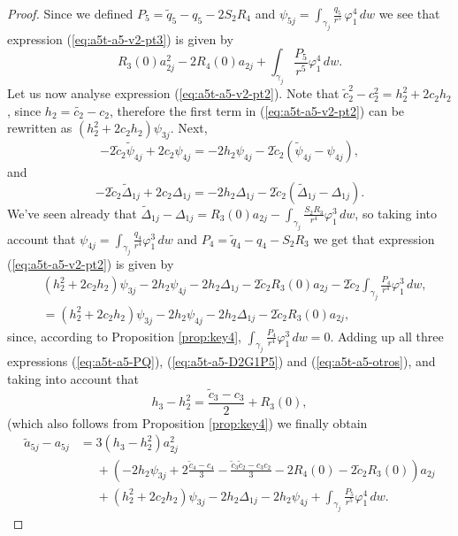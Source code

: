 \begin{proof}
Since we defined $P_5=\tilde{q}_5-q_5-2S_2R_4$ and $\psi_{5j}=\int_{\gamma_j}\frac{q_5}{r^5}\,\varphi_1^4\,dw$ we see that expression (\ref{eq:a5t-a5-v2-pt3}) is given by
\begin{equation}\label{eq:a5t-a5-D2G1P5}
 R_3(0)a_{2j}^2-2R_4(0)a_{2j}+\int_{\gamma_j}\frac{P_5}{r^5}\varphi_1^4\,dw.
\end{equation}
Let us now analyse expression (\ref{eq:a5t-a5-v2-pt2}). Note that $\tilde{c}_2^2-c_2^2=h_2^2+2c_2h_2$, since $h_2=\tilde{c_2}-c_2$, therefore the first term in (\ref{eq:a5t-a5-v2-pt2}) can be rewritten as $(h_2^2+2c_2h_2)\psi_{3j}$. Next,
\[ -2\tilde{c}_2\tilde{\psi}_{4j}+2c_2\psi_{4j}=-2h_2\psi_{4j}-2\tilde{c}_2(\tilde{\psi}_{4j}-\psi_{4j}), \]
and
\[ -2\tilde{c}_2\widetilde{\Delta}_{1j}+2c_2\Delta_{1j}=-2h_2\Delta_{1j}-2\tilde{c}_2(\widetilde{\Delta}_{1j}-\Delta_{1j}). \]
We've seen already that $\widetilde{\Delta}_{1j}-\Delta_{1j}=R_3(0)a_{2j}-\int_{\gamma_j}\frac{S_2R_3}{r^4}\varphi_1^3\,dw$, so taking into account that $\psi_{4j}=\int_{\gamma_j}\frac{q_4}{r^4}\varphi_1^3\,dw$ and $P_4=\tilde{q}_4-q_4-S_2R_3$ we get that expression (\ref{eq:a5t-a5-v2-pt2}) is given by
\begin{align}\label{eq:a5t-a5-otros}
&  (h_2^2+2c_2h_2)\psi_{3j}-2h_2\psi_{4j}-2h_2\Delta_{1j}-2\tilde{c}_2R_3(0)a_{2j}-2\tilde{c}_2\int_{\gamma_j}\frac{P_4}{r^4}\varphi_1^3\,dw, \nonumber \\
&= (h_2^2+2c_2h_2)\psi_{3j}-2h_2\psi_{4j}-2h_2\Delta_{1j}-2\tilde{c}_2R_3(0)a_{2j},
\end{align}
since, according to Proposition \ref{prop:key4}, $\int_{\gamma_j}\frac{P_4}{r^4}\varphi_1^3\,dw=0$. Adding up all three expressions (\ref{eq:a5t-a5-PQ}), (\ref{eq:a5t-a5-D2G1P5}) and (\ref{eq:a5t-a5-otros}), and taking into account that 
\[ h_3-h_2^2=\frac{\tilde{c}_3-c_3}{2}+R_3(0), \]
(which also follows from Proposition \ref{prop:key4}) we finally obtain
\begin{align}\label{eq:a5t-a5-v2}
\tilde{a}_{5j}-a_{5j} &= 3(h_3-h_2^2)a_{2j}^2 \nonumber\\
&\phantom{=} + \left(-2h_2\psi_{3j}+2\frac{\tilde{c}_4-c_4}{3}-\frac{\tilde{c}_3\tilde{c}_2-c_3c_2}{3}-2R_4(0)-2\tilde{c}_2R_3(0)\right)a_{2j} \\
&\phantom{=} +(h_2^2+2c_2h_2)\psi_{3j}-2h_2\Delta_{1j}-2h_2\psi_{4j}+\int_{\gamma_j}\frac{P_5}{r^5}\varphi_1^4\,dw.  \nonumber
\end{align}
	  

\end{proof}
